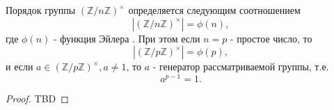 \begin{theorem}
Порядок группы $\left(\mathbb{Z}/n\mathbb{Z}\right)^\times$
определяется следующим соотношением
\[
\left|\left(\mathbb{Z}/n\mathbb{Z}\right)^\times\right| = \phi(n),
\]
где $\phi(n)$ - функция Эйлера . При этом если
$n=p$ - простое число, то
\[
\left|\left(\mathbb{Z}/p\mathbb{Z}\right)^\times\right| = \phi(p),
\]
и если $a \in \left(\mathbb{Z}/p\mathbb{Z}\right)^\times, a \ne 1$,
то $a$ - генератор рассматриваемой группы, т.е.
\[
a^{p-1} = 1.
\]
\begin{proof}
TBD
\end{proof}
\label{thm:add:algebra:cyclic_mult_group}
\end{theorem}

